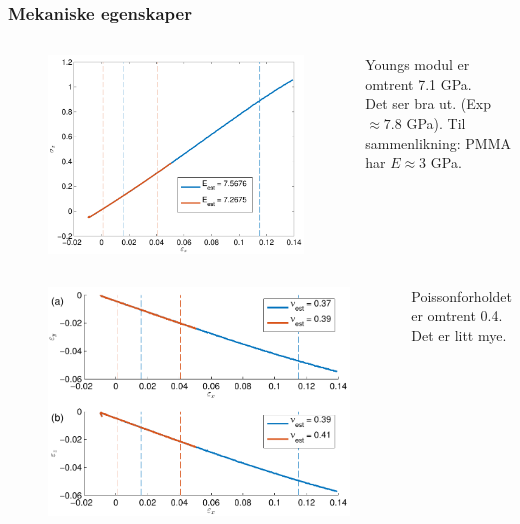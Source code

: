 \documentclass[utf8x, notes, graphics]{beamer}
\begin{document}
\begin{frame}
\frametitle{Mekaniske egenskaper}
{
	\begin{columns}
	\begin{figure}
		\includegraphics[width=\textwidth]{../figures/thesis/stress_strain_11_11_11_tip4p_ice_uam.pdf}
	\end{figure}
	Youngs modul er omtrent 7.1 GPa.\\
	\vspace{3mm}
	Det ser bra ut. (Exp $\approx 7.8$ GPa).
	Til sammenlikning: PMMA har $E \approx 3$ GPa.
	\end{columns}
}
{
	\begin{columns}
	\column{0.7\textwidth}
	\begin{figure}
		\includegraphics[width=\textwidth]{../figures/thesis/strain_strain_11_11_11_y_z_poisson_tip4p_ice_uam.pdf}
	\end{figure}
	\column{0.3\textwidth}
	Poissonforholdet er omtrent 0.4.\\
	\vspace{3mm}
	Det er litt mye.
	\end{columns}
}
\end{frame}
\end{document}
